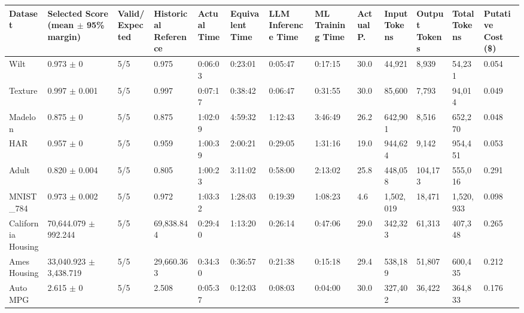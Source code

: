 \begin{tabular}{lllllllllllll}
\hline
Dataset & Selected Score (mean \ensuremath{\pm} 95\% margin) & Valid/Expected & Historical Reference & Actual Time & Equivalent Time & LLM Inference Time & ML Training Time & Actual P. & Input Tokens & Output Tokens & Total Tokens & Putative Cost (\$) \\
\hline
Wilt & 0.973 \ensuremath{\pm} 0 & 5/5 & 0.975 & 0:06:03 & 0:23:01 & 0:05:47 & 0:17:15 & 30.0 & 44,921 & 8,939 & 54,231 & 0.054 \\
Texture & 0.997 \ensuremath{\pm} 0.001 & 5/5 & 0.997 & 0:07:17 & 0:38:42 & 0:06:47 & 0:31:55 & 30.0 & 85,600 & 7,793 & 94,014 & 0.049 \\
Madelon & 0.875 \ensuremath{\pm} 0 & 5/5 & 0.875 & 1:02:09 & 4:59:32 & 1:12:43 & 3:46:49 & 26.2 & 642,901 & 8,516 & 652,270 & 0.048 \\
HAR & 0.957 \ensuremath{\pm} 0 & 5/5 & 0.959 & 1:00:39 & 2:00:21 & 0:29:05 & 1:31:16 & 19.0 & 944,624 & 9,142 & 954,451 & 0.053 \\
Adult & 0.820 \ensuremath{\pm} 0.004 & 5/5 & 0.805 & 1:00:23 & 3:11:02 & 0:58:00 & 2:13:02 & 25.8 & 448,058 & 104,173 & 555,016 & 0.291 \\
MNIST\_784 & 0.973 \ensuremath{\pm} 0.002 & 5/5 & 0.972 & 1:03:32 & 1:28:03 & 0:19:39 & 1:08:23 & 4.6 & 1,502,019 & 18,471 & 1,520,933 & 0.098 \\
California Housing & 70,644.079 \ensuremath{\pm} 992.244 & 5/5 & 69,838.844 & 0:29:40 & 1:13:20 & 0:26:14 & 0:47:06 & 29.0 & 342,323 & 61,313 & 407,348 & 0.265 \\
Ames Housing & 33,040.923 \ensuremath{\pm} 3,438.719 & 5/5 & 29,660.363 & 0:34:30 & 0:36:57 & 0:21:38 & 0:15:18 & 29.4 & 538,189 & 51,807 & 600,435 & 0.212 \\
Auto MPG & 2.615 \ensuremath{\pm} 0 & 5/5 & 2.508 & 0:05:37 & 0:12:03 & 0:08:03 & 0:04:00 & 30.0 & 327,402 & 36,422 & 364,833 & 0.176 \\
\hline
\end{tabular}
